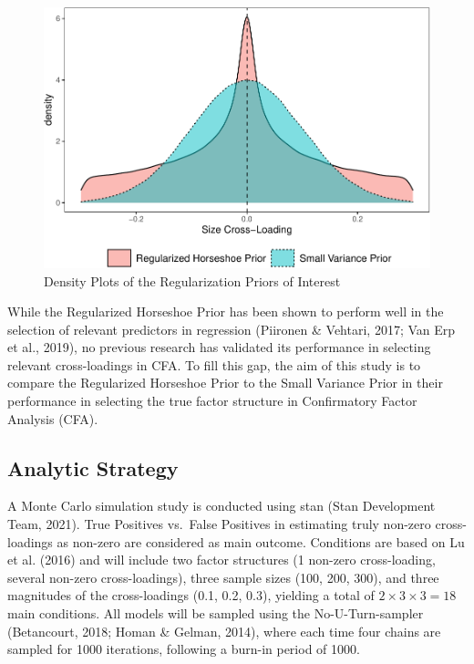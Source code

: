 \documentclass[
  english,
  man]{apa6}
\begin{document}
\begin{figure}
\centering
\includegraphics{JMBKoch_Proposal_files/figure-latex/unnamed-chunk-1-1.pdf}
\caption{\label{fig:unnamed-chunk-1}Density Plots of the Regularization Priors of Interest}
\end{figure}

While the Regularized Horseshoe Prior has been shown to perform well in
the selection of relevant predictors in regression
(Piironen \& Vehtari, 2017; Van Erp et al., 2019), no previous research
has validated its performance in selecting relevant cross-loadings in
CFA. To fill this gap, the aim of this study is to compare the
Regularized Horseshoe Prior to the Small Variance Prior in their
performance in selecting the true factor structure in Confirmatory
Factor Analysis (CFA).

\hypertarget{analytic-strategy}{%
\subsection{Analytic Strategy}\label{analytic-strategy}}

A Monte Carlo simulation study is conducted using stan
(Stan Development Team, 2021). True Positives vs.~False Positives
in estimating truly non-zero cross-loadings as non-zero are considered
as main outcome. Conditions are based on Lu et al. (2016) and will
include two factor structures (1 non-zero cross-loading, several
non-zero cross-loadings), three sample sizes (100, 200, 300), and three
magnitudes of the cross-loadings (0.1, 0.2, 0.3), yielding a total of
\(2 \times 3 \times 3 = 18\) main conditions. All models will be sampled
using the No-U-Turn-sampler (Betancourt, 2018; Homan \& Gelman, 2014), where each time
four chains are sampled for 1000 iterations, following a burn-in period
of 1000.
\end{document}
